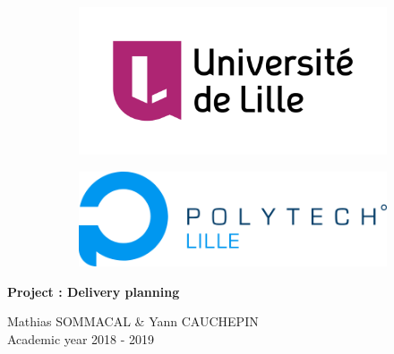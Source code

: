 \begin{titlepage}

	\begin{figure}[t]
		\begin{subfigure}[h]{0.5\linewidth}
			
			\begin{flushleft}
				\includegraphics[scale=0.2]{Media/UniversiteLille.png}
			\end{flushleft}
		\end{subfigure}
		\begin{subfigure}[h]{0.5\linewidth}
			\begin{flushright}
				\includegraphics[scale=0.25]{Media/PolytechLille.png}
			\end{flushright}
		\end{subfigure}

	\end{figure}

	\centering 

	\huge
	\vspace*{4cm}
	\textbf{Project : Delivery planning\\}

	\Large

	\vspace{9cm}
	Mathias SOMMACAL \& Yann CAUCHEPIN\\

	\vspace{1cm}
	Academic year 2018 - 2019\\


\end{titlepage}